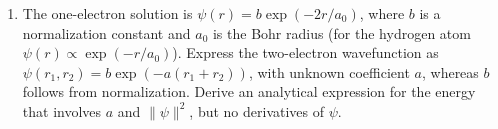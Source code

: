 \documentclass{article}
\begin{document}
\begin{enumerate}
\begin{enumerate}
\item The one-electron solution is $\psi(r) = b \exp(-2r/a_0)$, where $b$ is a normalization constant and $a_0$ is the Bohr radius (for the hydrogen atom $\psi(r) \propto \exp(-r/a_0)$). Express the two-electron wavefunction as $\psi(r_1,r_2) = b \exp(- a (r_1+r_2))$, with unknown coefficient $a$, whereas $b$ follows from normalization.
  Derive an analytical expression for the energy that involves $a$ and $\lVert \psi \rVert^2$, but no derivatives of $\psi$. 


\end{enumerate}



\end{enumerate}
\end{document}
